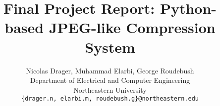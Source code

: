 \documentclass[10pt,twocolumn,letterpaper]{article}
\title{Final Project Report: Python-based JPEG-like Compression System}
\author{
Nicolas Drager, Muhammad Elarbi, George Roudebush\\
Department of Electrical and Computer Engineering\\
Northeastern University\\
\texttt{\{drager.n, elarbi.m, roudebush.g\}@northeastern.edu}
}
\begin{document}
\maketitle
    





{
    \small
    
    
}

% 
\end{document}
